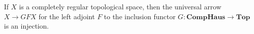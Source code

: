 If $X$ is a completely regular topological space, then the universal arrow $X \to GFX$ for the left adjoint $F$ to the inclusion functor $G: \mathbf{CompHaus} \to \mathbf{Top}$ is an injection.
